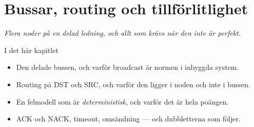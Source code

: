 \chapter{Bussar, routing och tillförlitlighet}
\label{ch:bussar}


{\large\itshape Flera noder på en delad ledning, och allt som krävs när den inte är perfekt.\par}

\begin{chapterbox}{I det här kapitlet}
\begin{itemize}
  \item Den delade bussen, och varför broadcast är normen i inbyggda system.
  \item Routing på DST och SRC, och varför den ligger i noden och inte i bussen.
  \item En felmodell som är \emph{deterministisk}, och varför det är hela poängen.
  \item ACK och NACK, timeout, omsändning --- och dubbletterna som följer.
\end{itemize}
\end{chapterbox}







